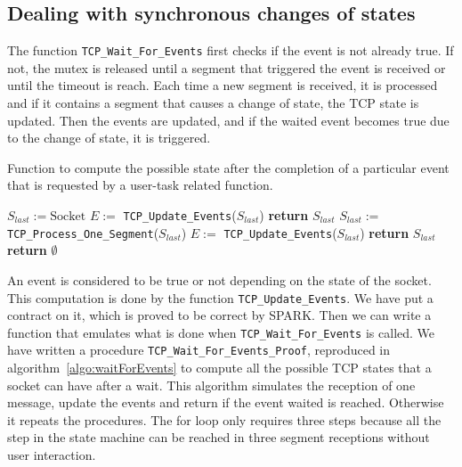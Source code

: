 \documentclass[conference]{IEEEtran}
\def\spark#1{\lstinline[language=Ada]{#1}}
\begin{document}
\subsection{Dealing with synchronous changes of states}

The function \spark{TCP_Wait_For_Events} first checks if the event is not already
true. If not, the mutex is released until a segment that triggered the event is
received or until the timeout is reach. Each time a new segment is received, it
is processed and if it contains a segment that causes a change of state, the TCP
state is updated. Then the events are updated, and if the waited event becomes
true due to the change of state, it is triggered.

\begin{algorithm}[t]
    \caption{Function to compute the possible state after the completion of a
particular event that is requested by a user-task related function.}
\label{algo:waitForEvents}
\begin{algorithmic}[1]
\footnotesize
{}
    \State $S_{last} := \text{Socket}$
    \State $E :=$ \spark{TCP_Update_Events}($S_{last}$)
        \State \textbf{return}  $S_{last}$
    \EndIf
        \State $S_{last} :=$ \spark{TCP_Process_One_Segment}($S_{last}$)
        \State $E :=$ \spark{TCP_Update_Events}($S_{last}$)
            \State \textbf{return} $S_{last}$
        \EndIf
    \EndFor
    \State \textbf{return} $\emptyset$
\EndFunction
\end{algorithmic}
\end{algorithm}

An event is considered to be true or not depending on the state of the socket.
This computation is done by the function \spark{TCP_Update_Events}. We have put
a contract on it, which is proved to be correct by SPARK. Then we can write a
function that emulates what is done when \spark{TCP_Wait_For_Events} is called.
We have written a procedure \spark{TCP_Wait_For_Events_Proof}, reproduced in
algorithm~\ref{algo:waitForEvents} to compute all the possible TCP states that a
socket can have after a wait. This algorithm simulates the reception of
one message, update the events and return if the event waited is reached.
Otherwise it repeats the procedures. The for loop only requires three steps
because all the step in the state machine can be reached in three segment
receptions without user interaction.
\end{document}
